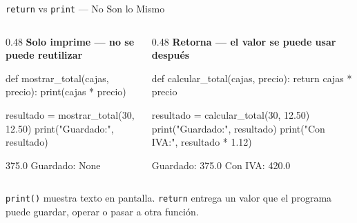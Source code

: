 \documentclass[aspectratio=169, 11pt]{beamer}
\begin{document}
\begin{frame}[fragile,shrink=28]{\texttt{return} vs \texttt{print} --- No Son lo Mismo}
  \vspace{-6pt}
  \begin{columns}[T]
    \begin{column}{0.48\textwidth}
      {\scriptsize\color{arcaRed}\bfseries\faExclamationTriangle\hspace{4pt}
        Solo imprime --- no se puede reutilizar}
      \begin{pyblock}
def mostrar_total(cajas, precio):
    print(cajas * precio)

resultado = mostrar_total(30, 12.50)
print("Guardado:", resultado)
      \end{pyblock}
      \vspace{-2pt}
      \begin{outputblock}
375.0
Guardado: None
      \end{outputblock}
    \end{column}

    \begin{column}{0.48\textwidth}
      {\scriptsize\color{codeGreen}\bfseries\faCheckCircle\hspace{4pt}
        Retorna --- el valor se puede usar después}
      \begin{pyblock}
def calcular_total(cajas, precio):
    return cajas * precio

resultado = calcular_total(30, 12.50)
print("Guardado:", resultado)
print("Con IVA:", resultado * 1.12)
      \end{pyblock}
      \vspace{-2pt}
      \begin{outputblock}
Guardado: 375.0
Con IVA: 420.0
      \end{outputblock}
    \end{column}
  \end{columns}

  \vspace{2pt}
  {\footnotesize\color{arcaDark}
    \texttt{print()} muestra texto en pantalla.
    \texttt{return} entrega un valor que el programa puede
    guardar, operar o pasar a otra función.}
\end{frame}
\end{document}

